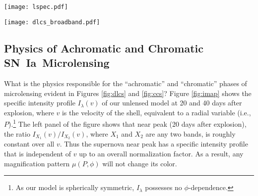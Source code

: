 \documentclass[iop,apj,numberedappendix,twocolappendix]{emulateapj}
\newcommand{\snia}{{\rm SN~Ia}}
\newcommand{\MCcode}{\texttt{SEDONA}}
\begin{document}
\begin{figure*}
	\centering
    \texttt{[image: lspec.pdf]}
    \caption{Rest-frame spectra of model W7 \citep{w7} computed with \MCcode\ near peak brightness and well into the onset of the infrared secondary maximum.
    The solid curve is unlensed and the dashed curve is lensed by star field (h) from Figure \ref{fig:mmap}. 
    Near peak brightness, microlensing does not have a large effect on the shape of the spectrum or the relative strengths of its features.
    During the chromatic phase, lensing-induced continuum shifts and spectral line distortions are visible in the ratios of the spectra. 
    Such chromatic distortions can affect the colors of the supernova.}
    \label{fig:lspec}
\end{figure*}


\begin{figure*}
	\centering
    \texttt{[image: dlcs\_broadband.pdf]}
    \caption{Four randomly chosen examples of broadband rest-frame difference light curves of model W7 computed by \MCcode.
    Each set of difference light curves has two distinct phases: an ``achromatic'' phase  in which $\Delta M$ is the same in all bands to within a few millimag, and a ``chromatic'' phase in which $\Delta M$ can vary significantly from band to band.
    }
   \label{fig:dlcs}
\end{figure*}

\subsection{Physics of Achromatic and Chromatic \snia\ Microlensing}
What is the physics responsible for the ``achromatic'' and ``chromatic'' phases of microlensing evident in Figures \ref{fig:dlcs} and \ref{fig:ccs}?
Figure \ref{fig:imap} shows the specific intensity profile $I_\lambda(v)$ of our unlensed model at 20 and 40 days after explosion, where $v$ is the velocity of the shell, equivalent to a radial variable (i.e., $P$).\footnote{As our model is spherically symmetric, $I_\lambda$ possesses no $\phi$-dependence.}
The left panel of the figure shows that near peak (20 days after explosion), the ratio $I_{X_1}(v)/I_{X_2}(v)$, where $X_1$ and $X_2$ are any two bands, is roughly  constant over all $v$. 
Thus the supernova near peak has a specific intensity profile that is independent of $v$ up to an overall normalization factor.
As a result, any magnification pattern $\mu(P, \phi)$ will not change its color.
\end{document}
